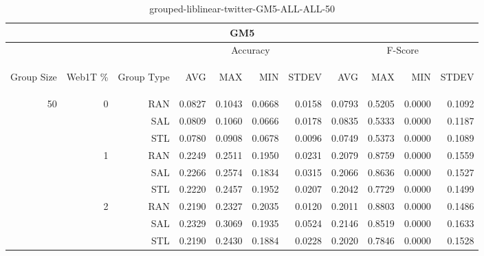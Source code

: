 \begin{center}
\begin{table}[htbp]
\begin{tabular}{ | r | r | r | r | r | r | r | r | r | r | r |}
\hline
\multicolumn{11}{|c|}{GM5}\\
\hline
 & & & \multicolumn{4}{|c|}{Accuracy} & \multicolumn{4}{|c|}{F-Score}\\ \cline{4-11}
\begin{sideways}Group Size\end{sideways} & \begin{sideways}Web1T \%\end{sideways} & \begin{sideways}Group Type\end{sideways} & \begin{sideways}AVG\end{sideways} & \begin{sideways}MAX\end{sideways} & \begin{sideways}MIN\end{sideways} & \begin{sideways}STDEV\end{sideways} & \begin{sideways}AVG\end{sideways} & \begin{sideways}MAX\end{sideways} & \begin{sideways}MIN\end{sideways} & \begin{sideways}STDEV\end{sideways}\\
\hline
\multirow{9}{*}{50}
 & \multirow{3}{*}{0} & RAN & 0.0827 & 0.1043 & 0.0668 & 0.0158 & 0.0793 & 0.5205 & 0.0000 & 0.1092\\ \cline{3-11}
 &   & SAL & 0.0809 & 0.1060 & 0.0666 & 0.0178 & 0.0835 & 0.5333 & 0.0000 & 0.1187\\ \cline{3-11}
 &   & STL & 0.0780 & 0.0908 & 0.0678 & 0.0096 & 0.0749 & 0.5373 & 0.0000 & 0.1089\\ \cline{2-11}
 & \multirow{3}{*}{1} & RAN & 0.2249 & 0.2511 & 0.1950 & 0.0231 & 0.2079 & 0.8759 & 0.0000 & 0.1559\\ \cline{3-11}
 &   & SAL & 0.2266 & 0.2574 & 0.1834 & 0.0315 & 0.2066 & 0.8636 & 0.0000 & 0.1527\\ \cline{3-11}
 &   & STL & 0.2220 & 0.2457 & 0.1952 & 0.0207 & 0.2042 & 0.7729 & 0.0000 & 0.1499\\ \cline{2-11}
 & \multirow{3}{*}{2} & RAN & 0.2190 & 0.2327 & 0.2035 & 0.0120 & 0.2011 & 0.8803 & 0.0000 & 0.1486\\ \cline{3-11}
 &   & SAL & 0.2329 & 0.3069 & 0.1935 & 0.0524 & 0.2146 & 0.8519 & 0.0000 & 0.1633\\ \cline{3-11}
 &   & STL & 0.2190 & 0.2430 & 0.1884 & 0.0228 & 0.2020 & 0.7846 & 0.0000 & 0.1528\\ \cline{2-11}
\hline
\end{tabular}
\caption{grouped-liblinear-twitter-GM5-ALL-ALL-50}
\end{table}
\end{center}

